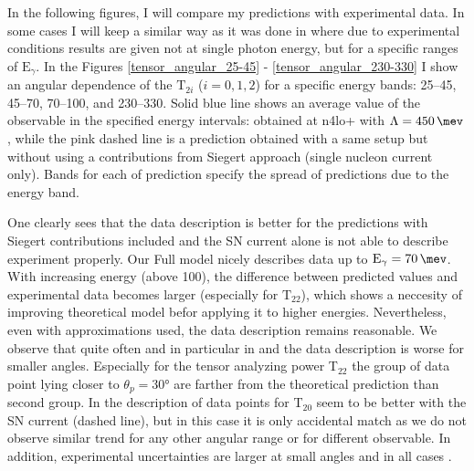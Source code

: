    
    In the following figures, I will compare my predictions with experimental data.
    In some cases I will keep a similar way as it was done
    in \cite{rachek2007} where due to experimental conditions results are given not at single photon energy,
    but for a specific ranges of $\text{E}_\gamma$.
    In the Figures \ref{tensor_angular_25-45} - \ref{tensor_angular_230-330}
    I show an angular dependence of the $\text{T}_{2i}$ ($i=0,1,2$) for a specific energy bands:
    \SIrange[range-phrase=--]{25}{45}{\mev}, \SIrange[range-phrase=--]{45}{70}{\mev},
    \SIrange[range-phrase=--]{70}{100}{\mev}, and \SIrange[range-phrase=--]{230}{330}{\mev}.
    Solid blue line shows an average value of the observable in the specified energy intervals:
    obtained at \gls{n4lo+} with $\Lambda=\SI{450}{\mev}$, while the pink dashed line is a prediction
    obtained with a same setup but without using a contributions from Siegert approach
    (single nucleon current only). Bands for each of prediction specify the spread of
    predictions due to the energy band.
    

    One clearly sees that the data description is better for the predictions with Siegert contributions included
    and the SN current alone is not able to describe experiment properly.
    Our Full model nicely describes data up to $\text{E}_\gamma = \SI{70}{\mev}$.
    With increasing energy (above \SI{100}{\mev}),
    the difference between predicted values and experimental data becomes larger
    (especially for $\text{T}_{22}$), 
    which shows a neccesity of improving theoretical model befor applying it to 
    higher energies. Nevertheless, even with approximations used,
    the data description remains reasonable. 
    We observe that quite often and in particular in  and 
    the data description is worse for smaller angles. Especially for the tensor analyzing power T$_{22}$
    the group of data point lying closer to $\theta_p = \ang{30}$ are farther 
    from the theoretical prediction than second group.
    In  the description of data points for T$_{20}$ seem to be better
    with the SN current (dashed line), but in this case it is only accidental match as we do not observe similar 
    trend for any other angular range or for different observable. 
    In addition, experimental uncertainties are larger at small angles and in all cases .
    




